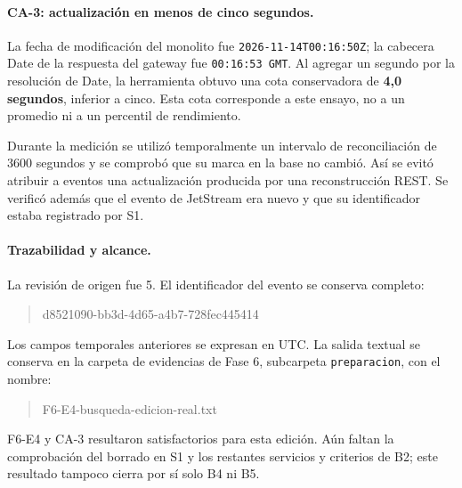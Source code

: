 \paragraph{CA-3: actualización en menos de cinco segundos.}
La fecha de modificación del monolito fue
\texttt{2026-11-14T00:16:50Z}; la cabecera Date de la respuesta del gateway
fue \texttt{00:16:53 GMT}. Al agregar un segundo por la resolución de Date,
la herramienta obtuvo una cota conservadora de \textbf{4,0 segundos},
inferior a cinco. Esta cota corresponde a este ensayo, no a un promedio
ni a un percentil de rendimiento.

Durante la medición se utilizó temporalmente un intervalo de reconciliación
de 3600 segundos y se comprobó que su marca en la base no cambió.
Así se evitó atribuir a eventos una actualización producida por una
reconstrucción REST. Se verificó además que el evento de JetStream era
nuevo y que su identificador estaba registrado por S1.

\paragraph{Trazabilidad y alcance.}
La revisión de origen fue 5. El identificador del evento se conserva completo:
\begin{quote}\small\ttfamily
d8521090-bb3d-4d65-a4b7-728fec445414
\end{quote}
Los campos temporales anteriores se expresan en UTC.
La salida textual se conserva en la carpeta de evidencias de Fase 6,
subcarpeta \texttt{preparacion}, con el nombre:
\begin{quote}\small\ttfamily
F6-E4-busqueda-edicion-real.txt
\end{quote}
F6-E4 y CA-3 resultaron satisfactorios para esta edición. Aún faltan la
comprobación del borrado en S1 y los restantes servicios y criterios de B2;
este resultado tampoco cierra por sí solo B4 ni B5.

